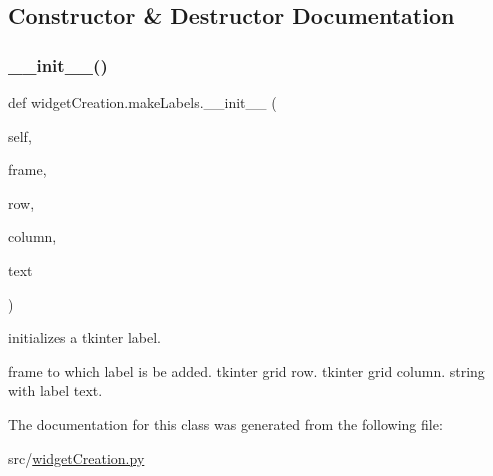 \subsection{Constructor \& Destructor Documentation}
\mbox{\label{classwidget_creation_1_1make_labels_a86db2b4904abbedc0933e73e60ceda29}} 
\subsubsection{\texorpdfstring{\+\_\+\+\_\+init\+\_\+\+\_\+()}{\_\_init\_\_()}}
{\footnotesize\ttfamily def widget\+Creation.\+make\+Labels.\+\_\+\+\_\+init\+\_\+\+\_\+ (\begin{DoxyParamCaption}\item[{}]{self,  }\item[{}]{frame,  }\item[{}]{row,  }\item[{}]{column,  }\item[{}]{text }\end{DoxyParamCaption})}



initializes a tkinter label. 

frame to which label is be added.  tkinter grid row.  tkinter grid column.  string with label text. 

The documentation for this class was generated from the following file\+:\begin{DoxyCompactItemize}
\item 
src/\hyperlink{widget_creation_8py}{widget\+Creation.\+py}\end{DoxyCompactItemize}
